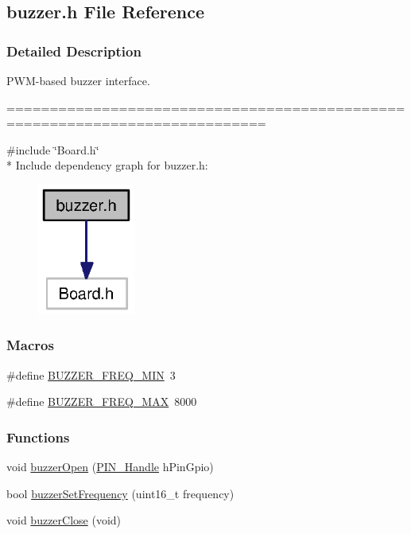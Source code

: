 \subsection{buzzer.\+h File Reference}
\label{buzzer_8h}


\subsubsection{Detailed Description}
P\+W\+M-\/based buzzer interface. 

============================================================================



{\ttfamily \#include \char`\"{}Board.\+h\char`\"{}}\\*
Include dependency graph for buzzer.\+h\+:
\nopagebreak
\begin{figure}[H]
\begin{center}
\leavevmode
\includegraphics[width=91pt]{buzzer_8h__incl}
\end{center}
\end{figure}
\subsubsection*{Macros}
\begin{DoxyCompactItemize}
\item 
\#define \hyperlink{buzzer_8h_a5a5d09ce30bf3af7088fd3086eb2ce4b}{B\+U\+Z\+Z\+E\+R\+\_\+\+F\+R\+E\+Q\+\_\+\+M\+I\+N}~3
\item 
\#define \hyperlink{buzzer_8h_aa97c9cbafb4c5b5fd2901e7efdedb4c3}{B\+U\+Z\+Z\+E\+R\+\_\+\+F\+R\+E\+Q\+\_\+\+M\+A\+X}~8000
\end{DoxyCompactItemize}
\subsubsection*{Functions}
\begin{DoxyCompactItemize}
\item 
void \hyperlink{buzzer_8h_a5d8eccb59342110fb98c2dddcf64f821}{buzzer\+Open} (\hyperlink{_p_i_n_8h_afb2de52b054638f63c39df1f30a0d88d}{P\+I\+N\+\_\+\+Handle} h\+Pin\+Gpio)
\item 
bool \hyperlink{buzzer_8h_a73ce175a266e49d188b2af8b2b57396b}{buzzer\+Set\+Frequency} (uint16\+\_\+t frequency)
\item 
void \hyperlink{buzzer_8h_affaf7d80f3c7d14cecdf483b8ce544de}{buzzer\+Close} (void)
\end{DoxyCompactItemize}


